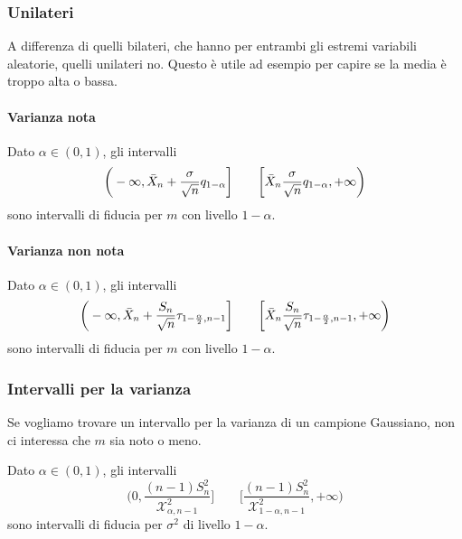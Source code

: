 \subsubsection{Unilateri}
A differenza di quelli bilateri, che hanno per entrambi gli estremi variabili aleatorie, quelli unilateri no. Questo è utile ad esempio per capire se la media è troppo alta o bassa.
\paragraph{Varianza nota}
\begin{definition}
	Dato $\alpha \in (0,1)$, gli intervalli
	\begin{equation}
		\bigg(-\infty, \bar{X}_n + \frac{\sigma}{\sqrt{n}} q_{1-\alpha}\bigg] \quad\quad \bigg[\bar{X}_n\-\frac{\sigma}{\sqrt{n}}q_{1-\alpha}, +\infty \bigg)
	\end{equation}
	sono intervalli di fiducia per $m$ con livello $1-\alpha$.
\end{definition}
\paragraph{Varianza non nota}
\begin{definition}
	Dato $\alpha \in (0,1)$, gli intervalli
	\begin{equation}
		\bigg(-\infty, \bar{X}_n + \frac{S_n}{\sqrt{n}} \tau_{1-\frac{\alpha}{2},n-1}\bigg] \quad\quad \bigg[\bar{X}_n\-\frac{S_n}{\sqrt{n}}\tau_{1-\frac{\alpha}{2},n-1}, +\infty \bigg)
	\end{equation}
	sono intervalli di fiducia per $m$ con livello $1-\alpha$.
\end{definition}

\subsubsection{Intervalli per la varianza}
Se vogliamo trovare un intervallo per la varianza di un campione Gaussiano, non ci interessa che $m$ sia noto o meno.
\begin{definition}
	Dato $\alpha \in (0,1)$, gli intervalli
	\begin{equation}
		\bigg(0, \frac{(n-1)S^2_n}{\mathcal{X}^2_{\alpha, n-1}}\bigg] \quad\quad \bigg[\frac{(n-1)S_n^2}{\mathcal{X}^2_{1-\alpha, n-1}}, +\infty\bigg)
	\end{equation}
	sono intervalli di fiducia per $\sigma^2$ di livello $1-\alpha$.
\end{definition}

